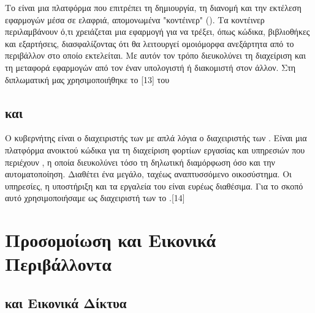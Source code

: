 Το  είναι μια πλατφόρμα που επιτρέπει τη δημιουργία, τη διανομή και την εκτέλεση εφαρμογών μέσα σε ελαφριά, απομονωμένα "κοντέινερ" (). 
Τα κοντέινερ περιλαμβάνουν ό,τι χρειάζεται μια εφαρμογή για να τρέξει, όπως κώδικα, βιβλιοθήκες και εξαρτήσεις, διασφαλίζοντας ότι θα λειτουργεί ομοιόμορφα 
ανεξάρτητα από το περιβάλλον στο οποίο εκτελείται. Με αυτόν τον τρόπο διευκολύνει τη διαχείριση και τη μεταφορά εφαρμογών από τον έναν υπολογιστή ή διακομιστή 
στον άλλον. Στη διπλωματική μας χρησιμοποιήθηκε το [13] του 

\subsection{ και }

Ο κυβερνήτης είναι ο διαχειριστής των με απλά λόγια ο διαχειριστής των . Είναι μια 
πλατφόρμα ανοικτού κώδικα για τη διαχείριση φορτίων εργασίας και υπηρεσιών που περιέχουν 
, η οποία διευκολύνει τόσο τη δηλωτική διαμόρφωση όσο και την αυτοματοποίηση. 
Διαθέτει ένα μεγάλο, ταχέως αναπτυσσόμενο οικοσύστημα. Οι υπηρεσίες, η υποστήριξη και τα εργαλεία του  είναι ευρέως διαθέσιμα. Για το σκοπό αυτό χρησιμοποιήσαμε ως διαχειριστή των  το .[14]






\section{Προσομοίωση και Εικονικά Περιβάλλοντα}

\subsection{ και Εικονικά Δίκτυα}

